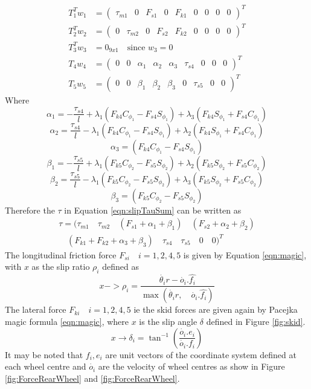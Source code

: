 {\begin{subequations}
	\label{eqn:slip_Tau_is}
	\begin{align}
	T_1^T w_1&=\begin{pmatrix}
	\tau_{m1} & 0 & F_{s1}& 0& F_{k1}&0&0&0&0
	\end{pmatrix} ^T\\
	T_2^T w_2&=\begin{pmatrix}
	0&\tau_{m2}& 0&F_{s2}&  F_{k2}&0&0&0&0
	\end{pmatrix} ^T\\
	T_3^T w_3&=0_{9x1} \quad \text{since } w_3=0\\
	T_4w_4&= \begin{pmatrix}
	0 & 0& \alpha_1& \alpha_2 & \alpha_3 &\tau_{s4}& 0&0 &0
	\end{pmatrix}^T\\
	T_5w_5&=\begin{pmatrix}
	0 & 0& \beta_1& \beta_2 & \beta_3 &0 &\tau_{s5}& 0&0
	\end{pmatrix}^T
	\end{align}
\end{subequations}
Where 
\[\alpha_1=-\frac{\tau_{s4}}{l}+\lambda_1(F_{k4}C_{\phi_1}-F_{s4}S_{\phi_1})+\lambda_3(F_{k4}S_{\phi_1}+F_{s4}C_{\phi_1})\]
\[\alpha_2=\frac{\tau_{s4}}{l}-\lambda_1(F_{k4}C_{\phi_1}-F_{s4}S_{\phi_1})+\lambda_2(F_{k4}S_{\phi_1}+F_{s4}C_{\phi_1})\]
\[\alpha_3=(F_{k4}C_{\phi_1}-F_{s4}S_{\phi_1})\]
\[\beta_1=-\frac{\tau_{s5}}{l}+\lambda_1(F_{k5}C_{\phi_2}-F_{s5}S_{\phi_2})+\lambda_2(F_{k5}S_{\phi_2}+F_{s5}C_{\phi_2})\]
\[\beta_2=\frac{\tau_{s5}}{l}-\lambda_1(F_{k5}C_{\phi_2}-F_{s5}S_{\phi_2})+\lambda_3(F_{k5}S_{\phi_2}+F_{s5}C_{\phi_2})\]
\[\beta_3=(F_{k5}C_{\phi_2}-F_{s5}S_{\phi_2})\]
Therefore the $\tau$ in  Equation \ref{eqn:slipTauSum} can be written as
\begin{multline}
\tau=(
\tau_{m1} \quad \tau_{m2} \quad (F_{s1}+\alpha_1+\beta_1) \quad( F_{s2}+\alpha_2+\beta_2) \\
 \quad  (F_{k1}+ F_{k2}+\alpha_3+\beta_3)\quad \tau_{s4}\quad  \tau_{s5} \quad 0 \quad 0 )  ^T
\end{multline}
The longitudinal  friction force $F_{si} \quad i=1,2,4,5 $ is given by Equation \ref{eqn:magic}, with $ x $ as the slip ratio $\rho_i$ defined as
\[
x->\rho_i = \frac{\dot{\theta_i} r - \dot{o_i}.\hat{f_i}}{\max(\dot{\theta_i} r,\quad \dot{o_i}.\hat{f_i})}
\]
The lateral force  $F_{ki} \quad i=1,2,4,5 $ ie the skid forces are given again by Pacejka magic formula \ref{eqn:magic},  where $x$ is the slip angle $\delta$ defined in Figure \ref{fig:skid}. 
\[
x \rightarrow \delta_i=\tan^{-1}(\frac{\dot{o_i}.e_i}{\dot{o_i}.f_i})
\]
It may be noted that $f_i,e_i$ are unit vectors of the coordinate system defined at each wheel centre and $\dot{o_i}$ are the velocity of wheel centres as show in Figure  \ref{fig:ForceRearWheel} and \ref{fig:ForceRearWheel}.
}
